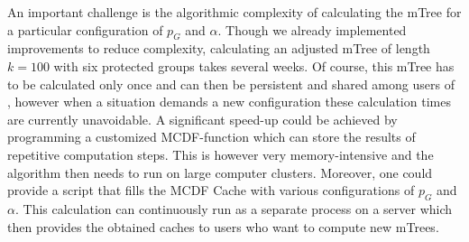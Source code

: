%
An important challenge is the algorithmic complexity of calculating the mTree for a particular configuration of $p_G$ and $\alpha$.
%
Though we already implemented improvements to reduce complexity, calculating an adjusted mTree of length $k=100$ with six protected groups takes several weeks.
%
Of course, this mTree has to be calculated only once and can then be persistent and shared among users of \algoFAIR, however when a situation demands a new configuration these calculation times are currently unavoidable.
%
A significant speed-up could be achieved by programming a customized MCDF-function which can store the results of repetitive computation steps.
%
This is however very memory-intensive and the algorithm then needs to run on large computer clusters.
%
Moreover, one could provide a script that fills the MCDF Cache with various configurations of $p_G$ and $\alpha$.
%
%
This calculation can continuously run as a separate process on a server which then provides the obtained caches to users who want to compute new mTrees.

